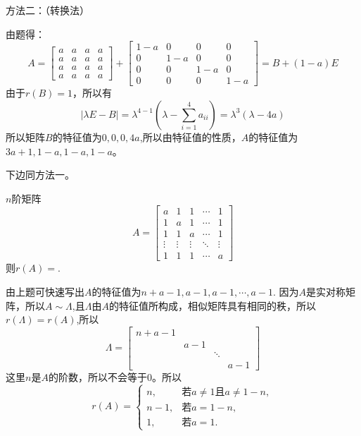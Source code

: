\documentclass{article}
\begin{document}
\begin{jie}
方法二：（转换法）

由题得：
\begin{equation*}A=
  \begin{bmatrix}
    a & a& a& a \\
    a & a& a& a \\
    a & a& a& a \\
    a & a& a& a
  \end{bmatrix}+
   \begin{bmatrix}
    1-a & 0& 0& 0 \\
    0 & 1-a& 0& 0 \\
    0 & 0& 1-a& 0 \\
    0 & 0& 0& 1-a
  \end{bmatrix}=B+(1-a)E
\end{equation*}
由于$r(B)=1$，所以有
\begin{equation*}
  |\lambda E -B|=\lambda^{4-1}\left(\lambda-\sum\limits_{i=1}^{4}a_{ii}\right)=
  \lambda^{3}\left(\lambda-4a\right)
\end{equation*}
所以矩阵$B$的特征值为$0,0,0,4a$,所以由特征值的性质，$A$的特征值为$3a+1,1-a,1-a,1-a$。

下边同方法一。
\end{jie}

$n$阶矩阵
\begin{equation*}
A=
\begin{bmatrix}
  a & 1 & 1 & \cdots & 1\\
 1 & a & 1&\cdots & 1\\
 1 & 1 & a & \cdots &1\\
 \vdots&\vdots&\vdots&\ddots&\vdots\\
 1&1&1&\cdots&a
\end{bmatrix}
\end{equation*}
则$r(A)=$\underline{\hphantom{~~~~~~~~~~~~~}}.

\begin{jie}
由上题可快速写出$A$的特征值为$n+a-1,a-1,a-1,\cdots,a-1$.
因为$A$是实对称矩阵，所以$A\sim \Lambda$,且$\Lambda$由$A$的特征值所构成，相似矩阵具有相同的秩，所以$r(\Lambda)=r(A)$,所以
\begin{equation*}
\Lambda=
\begin{bmatrix}
  n+a-1 & && \\
   & a-1 &&\\
   &&\ddots&\\
   &&&a-1
\end{bmatrix}
\end{equation*}
这里$n$是$A$的阶数，所以不会等于$0$。所以
\begin{equation*}r(A)=
  \begin{cases}
  n,&\text{若}a\neq 1\text{且}a\neq 1-n,\\
  n-1,&\text{若}a=1-n,\\
  1,&\text{若}a=1.
  \end{cases}
\end{equation*}
\end{jie}
\end{document}

